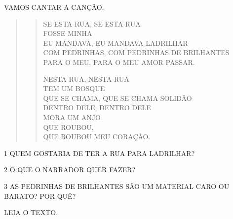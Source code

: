 VAMOS CANTAR A CANÇÃO.

\begin{quote}
\begin{verse}
SE ESTA RUA, SE ESTA RUA\\
FOSSE MINHA\\
EU MANDAVA, EU MANDAVA LADRILHAR\\
COM PEDRINHAS, COM PEDRINHAS DE BRILHANTES\\
PARA O MEU, PARA O MEU AMOR PASSAR.

NESTA RUA, NESTA RUA\\
TEM UM BOSQUE\\
QUE SE CHAMA, QUE SE CHAMA SOLIDÃO\\
DENTRO DELE, DENTRO DELE\\
MORA UM ANJO\\
QUE ROUBOU,\\
QUE ROUBOU MEU CORAÇÃO.
\end{verse}

\end{quote}

\num{1} QUEM GOSTARIA DE TER A RUA PARA LADRILHAR?


\num{2} O QUE O NARRADOR QUER FAZER?


\num{3} AS PEDRINHAS DE BRILHANTES SÃO UM MATERIAL CARO OU BARATO? POR QUÊ?


\pagebreak
LEIA O TEXTO.

